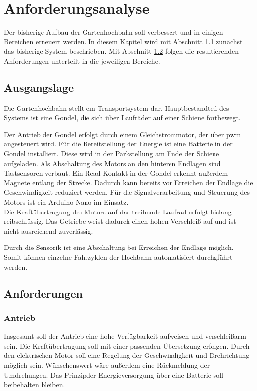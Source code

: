 \chapter{Anforderungsanalyse}
Der bisherige Aufbau der Gartenhochbahn soll verbessert und in einigen Bereichen erneuert werden. 
In diesem Kapitel wird mit Abschnitt \ref{sec:ausgangslage}
 zunächst das bisherige System beschrieben. 
Mit Abschnitt \ref{sec:anforderungen} folgen die resultierenden Anforderungen unterteilt in die jeweiligen Bereiche.  

\section{Ausgangslage}
\label{sec:ausgangslage}
Die Gartenhochbahn stellt ein Transportsystem dar. Hauptbestandteil des Systems ist eine Gondel, die sich über Laufräder 
auf einer Schiene fortbewegt. 

Der Antrieb der Gondel erfolgt durch einem Gleichstrommotor, der über \acrfull{pwm} angesteuert wird. Für die Bereitstellung der Energie ist eine Batterie in der Gondel installiert. Diese wird in der Parkstellung am Ende der Schiene aufgeladen. Als Abschaltung des Motors an den hinteren Endlagen sind Tastsensoren verbaut. Ein Read-Kontakt in der Gondel erkennt außerdem Magnete entlang der Strecke. Dadurch kann bereits vor Erreichen der Endlage die Geschwindigkeit reduziert werden. Für die Signalverarbeitung und Steuerung des Motors ist ein Arduino Nano im Einsatz. \\

Die Kraftübertragung des Motors auf das treibende Laufrad erfolgt bislang reibschlüssig. Das Getriebe weist dadurch einen hohen Verschleiß auf und ist nicht ausreichend zuverlässig. 

Durch die Sensorik ist eine Abschaltung bei Erreichen der Endlage möglich. Somit können einzelne Fahrzyklen der Hochbahn automatisiert durchgführt werden. 



\section{Anforderungen}
\label{sec:anforderungen}
\subsection{Antrieb}
Insgesamt soll der Antrieb eine hohe Verfügbarkeit aufweisen und verschleißarm sein. 
Die Kraftübertragung soll mit einer passenden Übersetzung erfolgen. Durch den elektrischen Motor soll eine Regelung der Geschwindigkeit und Drehrichtung möglich sein. Wünschenswert wäre außerdem eine Rückmeldung der Umdrehungen. 
Das Prinzipder Energieversorgung über eine Batterie soll beibehalten bleiben. 

